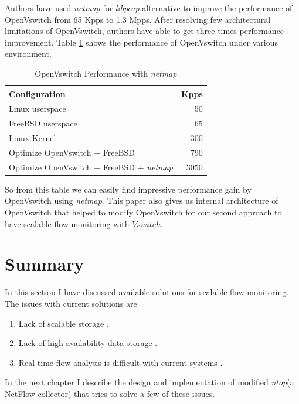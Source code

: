      Authors have used \emph{netmap} for \emph{libpcap} alternative to improve the performance of OpenVswitch from 65 Kpps to 1.3 Mpps.
     After resolving few architectural limitations of OpenVswitch, authors have able to get three times performance improvement.
     Table \ref{openvswitch-perf} shows the performance of OpenVswitch under various environment.\\
     \begin{table}[th]   
      \centering
      \begin{tabular}{|l|r|}
        \hline
        {\bf Configuration} & {\bf Kpps}  \\ \hline      
         Linux userspace     & 50          \\ \hline 
         FreeBSD userspace   & 65          \\ \hline 
         Linux Kernel        & 300         \\ \hline 
         Optimize OpenVswitch + FreeBSD & 790  \\ \hline
         Optimize OpenVswitch + FreeBSD + \emph{netmap} & 3050  \\ \hline
      
         \end{tabular}
       \caption{OpenVswitch Performance with \emph{netmap}}
       \label{openvswitch-perf}
     \end{table}
     So from this table we can easily find impressive performance gain by OpenVswitch using \emph{netmap}.
     This paper \cite{spf} also gives us internal architecture of OpenVswitch that helped to modify OpenVswitch
     for our second approach to have scalable flow monitoring with $Vswitch$.
     
     
      
     
     
     
      \section{Summary}
      In this section I have discussed  available solutions for scalable flow monitoring. The issues with current solutions are 
      \begin{enumerate}
       \item Lack of scalable storage \cite{emc2} \cite{nfdump}.
       \item Lack of high availability data storage \cite{Lee}.
       \item Real-time flow analysis is difficult with current systems \cite{Lee}.  
      \end{enumerate}

      
      In the next chapter I describe the design and implementation of modified \emph{ntop}(a NetFlow collector) that 
      tries to solve a few of these issues.
      
